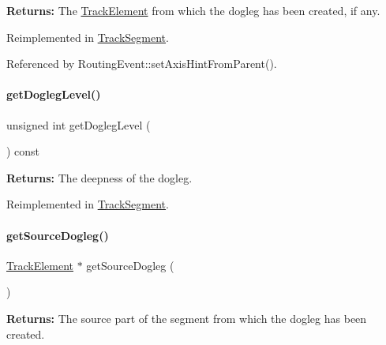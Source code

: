 {\bfseries Returns\+:} The \hyperlink{classKite_1_1TrackElement}{Track\+Element} from which the dogleg has been created, if any. 

Reimplemented in \hyperlink{classKite_1_1TrackSegment_a95ec3b8e7e1ec87c20ee0b37bcc96df7}{Track\+Segment}.



Referenced by Routing\+Event\+::set\+Axis\+Hint\+From\+Parent().

\mbox{\label{classKite_1_1TrackElement_add78c6f914788c549f144998caacda84}} 
\paragraph{\texorpdfstring{get\+Dogleg\+Level()}{getDoglegLevel()}}
{\footnotesize\ttfamily unsigned int get\+Dogleg\+Level (\begin{DoxyParamCaption}{ }\end{DoxyParamCaption}) const\hspace{0.3cm}{\ttfamily [virtual]}}

{\bfseries Returns\+:} The deepness of the dogleg. 

Reimplemented in \hyperlink{classKite_1_1TrackSegment_add78c6f914788c549f144998caacda84}{Track\+Segment}.

\mbox{\label{classKite_1_1TrackElement_a7e79fbfe77f173d46b1959c41087930a}} 
\paragraph{\texorpdfstring{get\+Source\+Dogleg()}{getSourceDogleg()}}
{\footnotesize\ttfamily \hyperlink{classKite_1_1TrackElement}{Track\+Element} $\ast$ get\+Source\+Dogleg (\begin{DoxyParamCaption}{ }\end{DoxyParamCaption})\hspace{0.3cm}{\ttfamily [virtual]}}

{\bfseries Returns\+:} The source part of the segment from which the dogleg has been created. 

